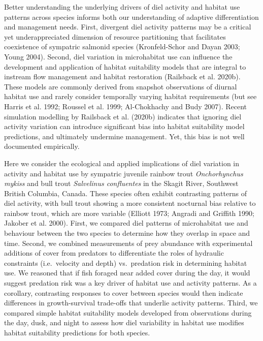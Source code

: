 \documentclass[]{article}
\begin{document}
Better understanding the underlying drivers of diel activity and habitat
use patterns across species informs both our understanding of adaptive
differentiation and management needs. First, divergent diel activity
patterns may be a critical yet underappreciated dimension of resource
partitioning that facilitates coexistence of sympatric salmonid species
(Kronfeld-Schor and Dayan 2003; Young 2004). Second, diel variation in
microhabitat use can influence the development and application of
habitat suitability models that are integral to instream flow management
and habitat restoration (Railsback et al. 2020b). These models are
commonly derived from snapshot observations of diurnal habitat use and
rarely consider temporally varying habitat requirements (but see Harris
et al. 1992; Roussel et al. 1999; Al-Chokhachy and Budy 2007). Recent
simulation modelling by Railsback et al. (2020b) indicates that ignoring
diel activity variation can introduce significant bias into habitat
suitability model predictions, and ultimately undermine management. Yet,
this bias is not well documented empirically.

Here we consider the ecological and applied implications of diel
variation in activity and habitat use by sympatric juvenile rainbow
trout \emph{Onchorhynchus mykiss} and bull trout \emph{Salvelinus
confluentes} in the Skagit River, Southwest British Columbia, Canada.
These species often exhibit contrasting patterns of diel activity, with
bull trout showing a more consistent nocturnal bias relative to rainbow
trout, which are more variable (Elliott 1973; Angradi and Griffith 1990;
Jakober et al. 2000). First, we compared diel patterns of microhabitat
use and behaviour between the two species to determine how they overlap
in space and time. Second, we combined measurements of prey abundance
with experimental additions of cover from predators to differentiate the
roles of hydraulic constraints (i.e.~velocity and depth) vs.~predation
risk in determining habitat use. We reasoned that if fish foraged near
added cover during the day, it would suggest predation risk was a key
driver of habitat use and activity patterns. As a corollary, contrasting
responses to cover between species would then indicate differences in
growth-survival trade-offs that underlie activity patterns. Third, we
compared simple habitat suitability models developed from observations
during the day, dusk, and night to assess how diel variability in
habitat use modifies habitat suitability predictions for both species.
\end{document}
